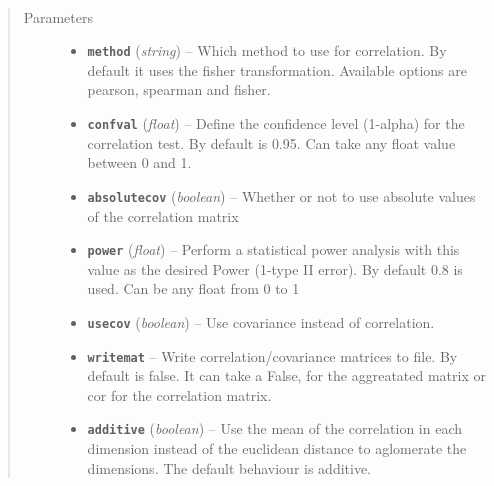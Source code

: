 \documentclass[letterpaper,10pt,english]{sphinxmanual}
\begin{document}
\begin{fulllineitems}

\begin{fulllineitems}
\label{Doc:Moduler.GMstats.Compute_correlations}~\begin{quote}\begin{description}
\item[{Parameters}] \leavevmode\begin{itemize}
\item {} 
\textbf{\texttt{method}} (\emph{string}) -- Which method to use for correlation. By default it uses the fisher transformation. Available options are pearson, spearman and fisher.

\item {} 
\textbf{\texttt{confval}} (\emph{float}) -- Define the confidence level (1-alpha) for the correlation test. By default is 0.95. Can take any float value between 0 and 1.

\item {} 
\textbf{\texttt{absolutecov}} (\emph{boolean}) -- Whether or not to use absolute values of the correlation matrix

\item {} 
\textbf{\texttt{power}} (\emph{float}) -- Perform a statistical power analysis with this value as the desired Power (1-type II error). By default 0.8 is used. Can be any float from 0 to 1

\item {} 
\textbf{\texttt{usecov}} (\emph{boolean}) -- Use covariance instead of correlation.

\item {} 
\textbf{\texttt{writemat}} -- Write correlation/covariance matrices to file. By default is false. It can take a False, for the aggreatated matrix or cor for the correlation matrix.

\item {} 
\textbf{\texttt{additive}} (\emph{boolean}) -- Use the mean of the correlation in each dimension instead of the euclidean distance to aglomerate the dimensions. The default behaviour is additive.

\end{itemize}

\end{description}\end{quote}


\end{fulllineitems}
\end{fulllineitems}
\end{document}
